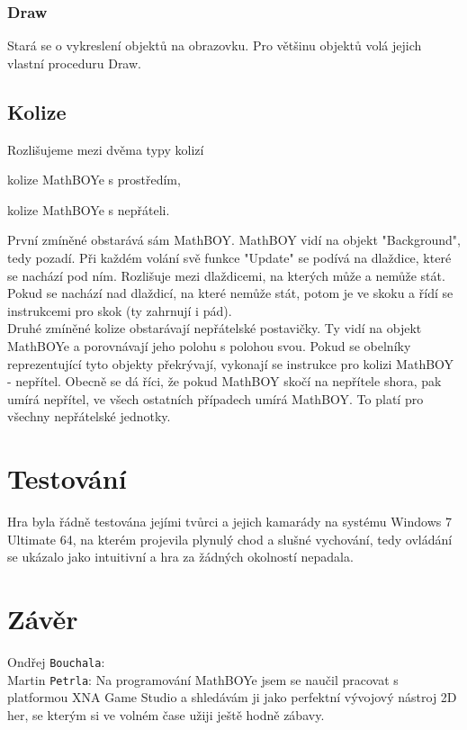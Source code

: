 \documentclass[a4paper,12pt,final]{article}
\begin{document}
\subsubsection{Draw}

Stará se o vykreslení objektů na obrazovku. Pro většinu objektů volá jejich vlastní proceduru Draw.

\subsection{Kolize}

Rozlišujeme mezi dvěma typy kolizí
\begin{compactitem}
	\item kolize MathBOYe s prostředím,
	\item kolize MathBOYe s nepřáteli.\\
\end{compactitem}

První zmíněné obstarává sám MathBOY. MathBOY vidí na objekt "Background", tedy pozadí. Při každém volání svě funkce "Update" se podívá na dlaždice, které se nachází pod ním. Rozlišuje mezi dlaždicemi, na kterých může a nemůže stát. Pokud se nachází nad dlaždicí, na které nemůže stát, potom je ve skoku a řídí se instrukcemi pro skok (ty zahrnují i pád).\\

Druhé zmíněné kolize obstarávají nepřátelské postavičky. Ty vidí na objekt MathBOYe a porovnávají jeho polohu s polohou svou. Pokud se obelníky reprezentující tyto objekty překrývají, vykonají se instrukce pro kolizi MathBOY - nepřítel. Obecně se dá říci, že pokud MathBOY skočí na nepřítele shora, pak umírá nepřítel, ve všech ostatních případech umírá MathBOY. To platí pro všechny nepřátelské jednotky.

\section{Testování}

Hra byla řádně testována jejími tvůrci a jejich kamarády na systému Windows 7 Ultimate 64, na kterém projevila plynulý chod a slušné vychování, tedy ovládání se ukázalo jako intuitivní a hra za žádných okolností nepadala.


\section{Závěr} %

Ondřej \texttt{Bouchala}: \\


Martin \texttt{Petrla}: Na programování MathBOYe jsem se naučil pracovat s platformou XNA Game Studio a shledávám ji jako perfektní vývojový nástroj 2D her, se kterým si ve volném čase užiji ještě hodně zábavy.


\end{document}
